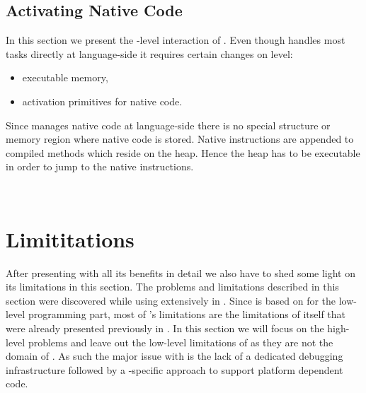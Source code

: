 \subsection{Activating Native Code}

In this section we present the \VM-level interaction of \NB.
Even though \NB handles most tasks directly at language-side it requires certain changes on \VM level:
%
\begin{itemize}[noitemsep]
	\item executable memory,
	\item activation primitives for native code.
\end{itemize}
%
Since \NB manages native code at language-side there is no special structure or memory region where native code is stored.
Native instructions are appended to compiled methods which reside on the heap.
Hence the heap has to be executable in order to jump to the native instructions.

\\

\section{\NB Limititations}

After presenting \NB with all its benefits in detail we also have to shed some light on its limitations in this section. 
The problems and limitations described in this section were discovered while using \NB extensively in \PH.
Since \NB is based on \B for the low-level programming part, most of \NB's limitations are the limitations of \B itself that were already presented previously in .
In this section we will focus on the high-level problems and leave out the low-level limitations of \B as they are not the domain of \NB.
As such the major issue with \NB is the lack of a dedicated debugging infrastructure followed by a \NB-specific approach to support platform dependent code.

